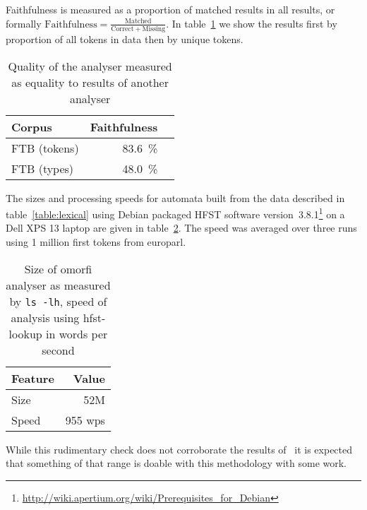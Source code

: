 \documentclass[a4paper,12pt]{article}
\begin{document}
Faithfulness is measured as a proportion of matched results in all results, or
formally $\mathrm{Faithfulness} = \frac{\mathrm{Matched}}{\mathrm{Correct} +
\mathrm{Missing}}$. In table~\ref{table:quality} we show the results first
by proportion of all tokens in data then by unique tokens.

\begin{table}
    \begin{scriptsize}
    \centering
    \begin{tabular}{|l|r|r|}
        \hline
        \bf Corpus & \bf Faithfulness \\
        \hline
        FTB (tokens) & 83.6~\% \\
        FTB (types)  & 48.0~\% \\
        \hline
    \end{tabular}
    \caption{Quality of the analyser measured as equality to results of
        another analyser \label{table:quality}}
  \end{scriptsize}
\end{table}

The sizes and processing speeds for automata built from the data described in
table~\ref{table:lexical} using Debian packaged HFST software
version~3.8.1\footnote{\url{http://wiki.apertium.org/wiki/Prerequisites_for_Debian}}
on a Dell XPS 13 laptop are given in table~\ref{table:size-speed}. The speed
was averaged over three runs using 1 million first tokens from europarl.

\begin{table}
    \begin{scriptsize}
        \centering
        \begin{tabular}{|l|r|}
            \hline
            \bf Feature & \bf Value \\
            \hline
            Size & 52M \\
            Speed & 955 wps\\
            \hline
        \end{tabular}
        \caption{Size of omorfi analyser as measured by \texttt{ls -lh}, speed
        of analysis using hfst-lookup in words per second \label{table:size-speed}}
    \end{scriptsize}
\end{table}

While this rudimentary check does not corroborate the results
of~\citet{silfverberg2009hfst} it is expected that something of that range is
doable with this methodology with some work.
\end{document}
